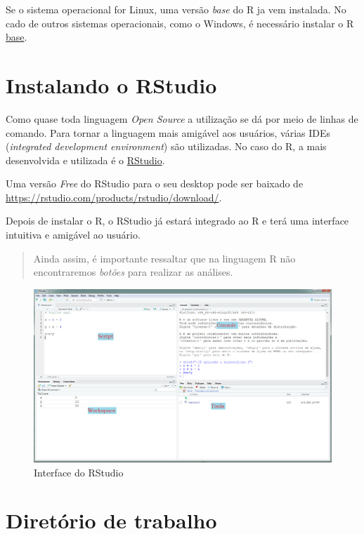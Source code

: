 \documentclass[
]{book}
\theoremstyle{definition}
\theoremstyle{definition}
\theoremstyle{definition}
\theoremstyle{remark}
\begin{document}
Se o sistema operacional for Linux, uma versão \emph{base} do R ja vem instalada. No cado de outros sistemas operacionais, como o Windows, é necessário instalar o R \href{https://cran.r-project.org/bin/windows/base/}{base}.

\hypertarget{instalando-o-rstudio}{%
\section{Instalando o RStudio}\label{instalando-o-rstudio}}

Como quase toda linguagem \emph{Open Source} a utilização se dá por meio de linhas de comando. Para tornar a linguagem mais amigável aos usuários, várias IDEs (\emph{integrated development environment}) são utilizadas. No caso do R, a mais desenvolvida e utilizada é o \href{https://rstudio.com/products/rstudio/}{RStudio}.

Uma versão \emph{Free} do RStudio para o seu desktop pode ser baixado de \url{https://rstudio.com/products/rstudio/download/}.

Depois de instalar o R, o RStudio já estará integrado ao R e terá uma interface intuitiva e amigável ao usuário.

\begin{quote}
Ainda assim, é importante ressaltar que na linguagem R não encontraremos \emph{botões} para realizar as análises.
\end{quote}

\begin{figure}
\includegraphics[width=0.9\linewidth]{Figuras/RStudio} \caption{Interface do RStudio}\label{fig:rstudio}
\end{figure}

\hypertarget{diretuxf3rio-de-trabalho}{%
\section{Diretório de trabalho}\label{diretuxf3rio-de-trabalho}}
\end{document}
